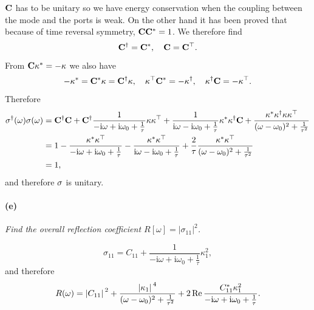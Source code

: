 \documentclass[hyperref, a4paper]{article}
\newcommand*{\ii}{\mathrm{i}}
\begin{document}
$\vb{C}$ has to be unitary so we have energy conservation 
when the coupling between the mode and the ports is weak.
On the other hand it has been proved that because of time reversal symmetry, 
$\vb{C} \vb{C}^* = 1$.
We therefore find 
\begin{equation}
    \vb{C}^\dagger = \vb{C}^*, \quad \vb{C} = \vb{C}^\top.
\end{equation}
From $\vb{C} \vb{\kappa}^* = - \vb{\kappa}$ we also have 
\begin{equation}
    - \vb{\kappa}^* = \vb{C}^* \vb{\kappa} = \vb{C}^\dagger \vb{\kappa}, \quad 
    \vb{\kappa}^\top \vb{C}^* = - \vb{\kappa}^\dagger, \quad 
    \vb{\kappa}^\dagger \vb{C} = - \vb{\kappa}^\top.
\end{equation}
Therefore 
\begin{equation}
    \begin{aligned}
        \vb{\sigma}^\dagger(\omega) \vb{\sigma}(\omega) &= \vb{C}^\dagger \vb{C} 
        + \vb{C}^\dagger \frac{1}{- \ii \omega + \ii \omega_0 + \frac{1}{\tau}} \vb{\kappa} \vb{\kappa}^\top 
        +  \frac{1}{\ii \omega - \ii \omega_0 + \frac{1}{\tau}} \vb{\kappa}^* \vb{\kappa}^\dagger \vb{C} 
        + \frac{\kappa^* \kappa^\dagger \kappa \kappa^\top}{(\omega - \omega_0)^2 + \frac{1}{\tau^2}} \\
        &= 1 - \frac{\kappa^* \kappa^\top}{- \ii \omega + \ii \omega_0 + \frac{1}{\tau}}
        - \frac{\kappa^* \kappa^\top}{\ii \omega - \ii \omega_0 + \frac{1}{\tau}}
        + \frac{2}{\tau} \frac{\vb{\kappa}^* \vb{\kappa}^\top}{(\omega - \omega_0)^2 + \frac{1}{\tau^2}} \\
        &= 1,
    \end{aligned}
\end{equation}
and therefore $\vb{\sigma}$ is unitary.

\paragraph*{(e)} \textit{Find the overall reflection coefficient $R[\omega]=\left|\sigma_{11}\right|^2$.} 

\begin{equation}
    \sigma_{11} = C_{11} + \frac{1}{- \ii \omega + \ii \omega_0 + \frac{1}{\tau}} \kappa_1^2,
\end{equation}
and therefore 
\begin{equation}
    R(\omega) = \abs*{C_{11}}^2 + \frac{\abs*{\kappa_1}^4}{(\omega - \omega_0)^2 + \frac{1}{\tau^2}} 
    + 2\Re \frac{ C_{11}^* \kappa_1^2}{- \ii \omega + \ii \omega_0 + \frac{1}{\tau}} .
\end{equation}
\end{document}

